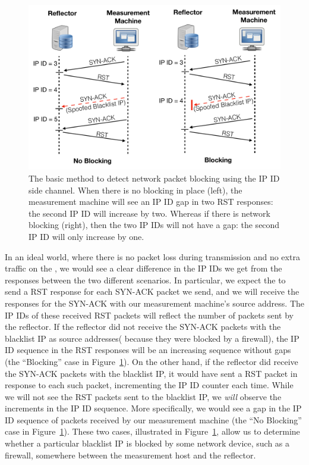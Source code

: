 
\begin{figure}[t]
    \centering
    \includegraphics[width=0.98\columnwidth]{images/cropped_method_protocol_v2.pdf}
    \caption{The basic method to detect network packet blocking using the IP ID side channel.
    When there is no blocking in place (left), the measurement machine will see
    an IP ID gap in two RST responses: the second IP ID will increase by two. Whereas
    if there is network blocking (right), then the two IP IDs will not have a gap:
    the second IP ID will only increase by one.}
    \label{fig:coreidea}
\end{figure}

In an ideal world, where there is no packet loss during transmission
and no extra traffic on the {}, we would see a clear difference
in the IP IDs we get from the responses between the two different scenarios.
In particular, we expect the {} to send a RST response for
each SYN-ACK packet we send, and we will receive the responses for
the SYN-ACK with our measurement machine's source address. The IP IDs of these
received RST packets will reflect the number of
packets sent by the reflector. If the reflector did not receive the SYN-ACK
packets with the blacklist IP as source addresses( because they were blocked by a
firewall), the IP ID sequence in the RST responses will be an
increasing sequence without gaps (the ``Blocking'' case in Figure~\ref{fig:coreidea}).
On the other hand, if the reflector did
receive the SYN-ACK packets with the blacklist IP, it would have sent
a RST packet in response to each such packet, incrementing the IP ID counter
each time. While we will not see the RST packets sent to the blacklist
IP, we \emph{will} observe the increments in the IP ID sequence.
More specifically, we would see a gap in the IP ID sequence of packets received
by our measurement machine (the ``No Blocking'' case in
Figure~\ref{fig:coreidea}).
These two cases, illustrated in Figure~\ref{fig:coreidea}, allow us to
determine whether a particular blacklist IP is blocked by some network
device, such as a firewall, somewhere between the measurement host and
the reflector.

